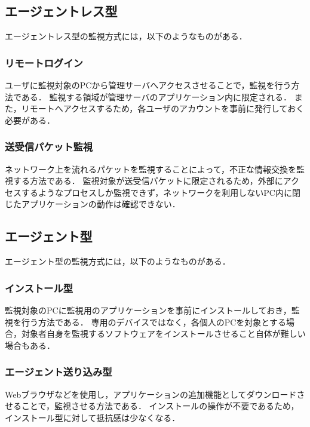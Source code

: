 \subsection{エージェントレス型}
エージェントレス型の監視方式には，以下のようなものがある．

\subsubsection{リモートログイン}
ユーザに監視対象のPCから管理サーバへアクセスさせることで，監視を行う方法である．
監視する領域が管理サーバのアプリケーション内に限定される．
また，リモートへアクセスするため，各ユーザのアカウントを事前に発行しておく必要がある．

\subsubsection{送受信パケット監視}
ネットワーク上を流れるパケットを監視することによって，不正な情報交換を監視する方法である．
監視対象が送受信パケットに限定されるため，外部にアクセスするようなプロセスしか監視できず，ネットワークを利用しないPC内に閉じたアプリケーションの動作は確認できない．

\subsection{エージェント型}
エージェント型の監視方式には，以下のようなものがある．

\subsubsection{インストール型}
監視対象のPCに監視用のアプリケーションを事前にインストールしておき，監視を行う方法である．
専用のデバイスではなく，各個人のPCを対象とする場合，対象者自身を監視するソフトウェアをインストールさせること自体が難しい場合もある．

\subsubsection{エージェント送り込み型}
Webブラウザなどを使用し，アプリケーションの追加機能としてダウンロードさせることで，監視させる方法である．
インストールの操作が不要であるため，インストール型に対して抵抗感は少なくなる．
